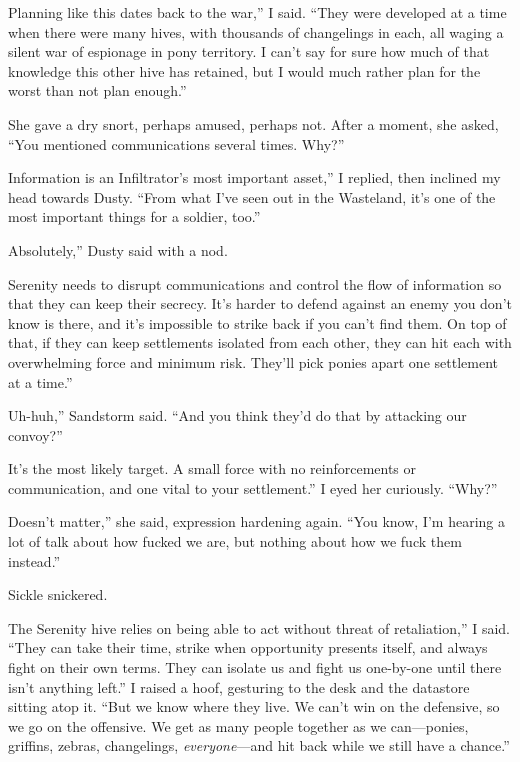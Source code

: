 \leavevmode{}Planning like this dates back to the war,” I said. “They were developed at a time when there were many hives, with thousands of changelings in each, all waging a silent war of espionage in pony territory. I can’t say for sure how much of that knowledge this other hive has retained, but I would much rather plan for the worst than not plan enough.”

She gave a dry snort, perhaps amused, perhaps not. After a moment, she asked, “You mentioned communications several times. Why?”

\leavevmode{}Information is an Infiltrator’s most important asset,” I replied, then inclined my head towards Dusty. “From what I’ve seen out in the Wasteland, it’s one of the most important things for a soldier, too.”

\leavevmode{}Absolutely,” Dusty said with a nod.

\leavevmode{}Serenity needs to disrupt communications and control the flow of information so that they can keep their secrecy. It’s harder to defend against an enemy you don’t know is there, and it’s impossible to strike back if you can’t find them. On top of that, if they can keep settlements isolated from each other, they can hit each with overwhelming force and minimum risk. They’ll pick ponies apart one settlement at a time.”

\leavevmode{}Uh-huh,” Sandstorm said. “And you think they’d do that by attacking our convoy?”

\leavevmode{}It’s the most likely target. A small force with no reinforcements or communication, and one vital to your settlement.” I eyed her curiously. “Why?”

\leavevmode{}Doesn’t matter,” she said, expression hardening again. “You know, I’m hearing a lot of talk about how fucked we are, but nothing about how we fuck them instead.”

Sickle snickered.

\leavevmode{}The Serenity hive relies on being able to act without threat of retaliation,” I said. “They can take their time, strike when opportunity presents itself, and always fight on their own terms. They can isolate us and fight us one-by-one until there isn’t anything left.” I raised a hoof, gesturing to the desk and the datastore sitting atop it. “But we know where they live. We can’t win on the defensive, so we go on the offensive. We get as many people together as we can—ponies, griffins, zebras, changelings, \textit{everyone}—and hit back while we still have a chance.”

